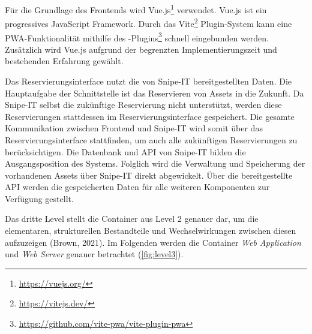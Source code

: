 Für die Grundlage des Frontends wird Vue.js\footnote{\url{https://vuejs.org/}} verwendet. Vue.js ist
ein progressives JavaScript Framework. Durch das Vite\footnote{\url{https://vitejs.dev/}}
Plugin-System kann eine PWA-Funktionalität mithilfe des
-Plugins\footnote{\url{https://github.com/vite-pwa/vite-plugin-pwa}}
schnell eingebunden werden. Zusätzlich wird Vue.js aufgrund der begrenzten Implementierungszeit und
bestehenden Erfahrung gewählt.

Das Reservierungsinterface nutzt die von Snipe-IT bereitgestellten Daten. Die
Hauptaufgabe der Schnittstelle ist das Reservieren von Assets in die Zukunft. Da
Snipe-IT selbst die zukünftige Reservierung nicht unterstützt, werden diese
Reservierungen stattdessen im Reservierungsinterface gespeichert. Die gesamte
Kommunikation zwischen Frontend und Snipe-IT wird somit über das
Reservierungsinterface stattfinden, um auch alle zukünftigen Reservierungen zu
berücksichtigen. Die Datenbank und API von Snipe-IT bilden die Ausgangsposition
des Systems. Folglich wird die Verwaltung und Speicherung der vorhandenen Assets
über Snipe-IT direkt abgewickelt. Über die bereitgestellte API werden die
gespeicherten Daten für alle weiteren Komponenten zur Verfügung gestellt.

\newpage
    {\sffamily\color{maincolor}{Level 3: Components}}

Das dritte Level stellt die Container aus Level 2 genauer dar, um die
elementaren, strukturellen Bestandteile und Wechselwirkungen zwischen diesen
aufzuzeigen (Brown, 2021). Im Folgenden werden die Container
\textit{Web Application} und \textit{Web Server} genauer betrachtet
(\ref{fig:level3}).

